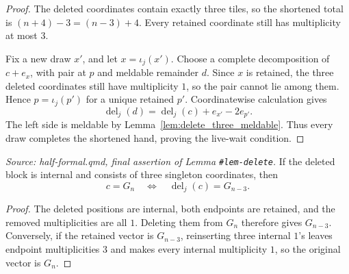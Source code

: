 \begin{proof}

\leanok
  The deleted coordinates contain exactly three tiles, so the shortened
  total is \((n+4)-3=(n-3)+4\).  Every retained coordinate still has
  multiplicity at most \(3\).

  Fix a new draw \(x'\), and let \(x=\iota_j(x')\).  Choose a complete
  decomposition of \(c+e_x\), with pair at \(p\) and meldable remainder
  \(d\).  Since \(x\) is retained, the three deleted coordinates still
  have multiplicity \(1\), so the pair cannot lie among them.  Hence
  \(p=\iota_j(p')\) for a unique retained \(p'\).  Coordinatewise
  calculation gives
  \[
    \operatorname{del}_j(d)
      =\operatorname{del}_j(c)+e_{x'}-2e_{p'}.
  \]
  The left side is meldable by
  Lemma~\ref{lem:delete_three_meldable}.  Thus every draw completes the
  shortened hand, proving the live-wait condition.
\end{proof}

\begin{theorem}
  \label{thm:delete_three_standard}
  \textit{Source: half-formal.qmd, final assertion of Lemma
  \texttt{\#lem-delete}.}
  If the deleted block is internal and consists of three singleton
  coordinates, then
  \[
    c=G_n\quad\Longleftrightarrow\quad
    \operatorname{del}_j(c)=G_{n-3}.
  \]
\end{theorem}
\begin{proof}

\leanok
  The deleted positions are internal, both endpoints are retained, and the
  removed multiplicities are all \(1\).  Deleting them from \(G_n\)
  therefore gives \(G_{n-3}\).  Conversely, if the retained vector is
  \(G_{n-3}\), reinserting three internal \(1\)'s leaves endpoint
  multiplicities \(3\) and makes every internal multiplicity \(1\), so the
  original vector is \(G_n\).
\end{proof}
